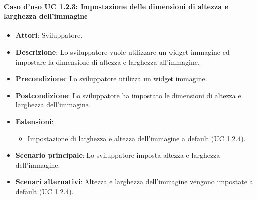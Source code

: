 \paragraph{Caso d'uso UC 1.2.3: Impostazione delle dimensioni di altezza e larghezza dell'immagine}

\FloatBarrier
\begin{itemize}
\item\textbf{Attori}: Sviluppatore.
\item\textbf{Descrizione}: Lo sviluppatore vuole utilizzare un widget immagine ed impostare la dimensione di altezza e larghezza all'immagine.
\item\textbf{Precondizione}: Lo sviluppatore utilizza un widget immagine.
\item\textbf{Postcondizione}: Lo sviluppatore ha impostato le dimensioni di altezza e larghezza dell'immagine.
\item \textbf{Estensioni}: 
\begin{itemize}
\item Impostazione di larghezza e altezza dell'immagine a default (UC 1.2.4).
\end{itemize}
\item\textbf{Scenario principale}: Lo sviluppatore imposta altezza e larghezza dell'immagine.
\item\textbf{Scenari alternativi}: Altezza e larghezza dell'immagine vengono impostate a default (UC 1.2.4).
\end{itemize}